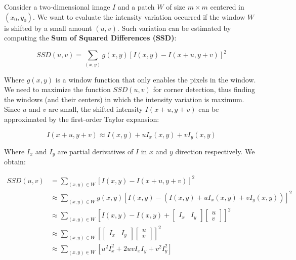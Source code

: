 \documentclass{article}
\begin{document}
Consider a two-dimensional image $I$ and a patch $W$ of size $m \times m$ centered in $(x_0, y_0)$. We want to evaluate the intensity variation occurred if the window $W$ is shifted by a small amount $(u, v)$. Such variation can be estimated by computing the \textbf{Sum of Squared Differences (SSD)}:

\begin{equation*}
    SSD(u, v) = \sum_{(x,y)}g(x,y)[I(x,y) - I(x+u, y+v)]^2
\end{equation*}

Where $g(x,y)$ is a window function that only enables the pixels in the window. We need to maximize the function $SSD(u,v)$ for corner detection, thus finding the windows (and their centers) in which the intensity variation is maximum. Since $u$ and $v$ are small, the shifted intensity $I(x+u, y+v)$ can be approximated by the first-order Taylor expansion:

\begin{equation*}
    I(x+u, y+v) \approx I(x,y) + uI_x(x,y) + vI_y(x,y)
\end{equation*}

Where $I_x$ and $I_y$ are partial derivatives of $I$ in $x$ and $y$ direction respectively. We obtain:

\begin{equation*}
    \begin{split}
        SSD(u, v) & = \sum_{(x,y) \in W}[I(x,y) - I(x+u, y+v)]^2 \\ & \approx \sum_{(x,y) \in W}g(x,y)[I(x,y) - (I(x,y) + uI_x(x,y) + vI_y(x,y))]^2 \\
        & \approx \sum_{(x,y) \in W}[I(x,y) - I(x,y) + \begin{bmatrix} I_x & I_y \end{bmatrix} \begin{bmatrix} u \\ v \end{bmatrix}]^2 \\
        & \approx \sum_{(x,y) \in W}[\begin{bmatrix} I_x & I_y \end{bmatrix} \begin{bmatrix} u \\ v \end{bmatrix}]^2 \\
        & \approx \sum_{(x,y) \in W}[u^2I_x^2+2uvI_xI_y+v^2I_y^2]
    \end{split}
\end{equation*}
\end{document}
